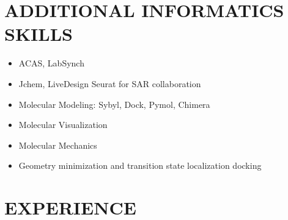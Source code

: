 \documentclass[margin, 10pt]{res} %
\begin{document}
\begin{resume}
\section{ADDITIONAL INFORMATICS \\ SKILLS} 
\begin{itemize}[leftmargin=*, label={}, noitemsep, labelindent=-5pt,itemindent=-50pt]
\item ACAS, LabSynch 
\item Jchem, LiveDesign Seurat for SAR collaboration
\item Molecular Modeling: Sybyl, Dock, Pymol, Chimera
\item Molecular Visualization
\item Molecular Mechanics
\item Geometry minimization and transition state localization docking 
\end{itemize} 

\section{EXPERIENCE}


\end{resume}
\end{document}
